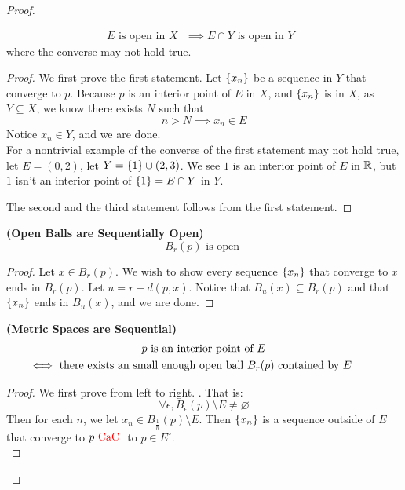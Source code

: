 \documentclass{report}
\begin{document}
\begin{proof}
\begin{theorem}
\begin{gather}
E\text{ is open in $X$ }\implies E\cap Y\text{ is open in $Y$ }
\end{gather}
where the converse may not hold true.
\end{theorem}
\begin{proof}
We first prove the first statement. Let $\{ x_n \}$ be a sequence in $Y$ that converge to $p$. Because  $p$ is an interior point of  $E$ in  $X$, and  $\{ x_n \}$ is in $X$, as  $Y\subseteq X$, we know there exists $N$ such that 
 \begin{equation}
n>N\implies x_n\in E
\end{equation}
Notice $x_n\in Y$, and we are done.\\

For a nontrivial example of the converse of the first statement may not hold true, let $E=(0,2)$, let $Y=\{ 1 \}\cup (2,3)$. We see $1$ is an interior point of  $E$ in  $\mathbb{R}$, but  $1$ isn't an interior point of  $\{ 1 \}=E\cap Y$ in $Y$.

The second and the third statement follows from the first statement. 
\end{proof}
\begin{theorem}
\label{1.3.9}
  \textbf{(Open Balls are Sequentially Open)} 
  \begin{equation}
  B_r(p)\text{ is open }
  \end{equation}
\end{theorem}
\begin{proof}
Let $x\in B_r(p)$. We wish to show every sequence $\{ x_n \}$ that converge to $x$ ends in  $B_r(p)$. Let $u=r-d(p,x)$. Notice that $B_u(x)\subseteq B_r(p)$ and that $\{ x_n \}$ ends in $B_u(x)$, and we are done.
\end{proof}
\begin{theorem}
\label{1.3.10}
\textbf{(Metric Spaces are Sequential)} 
\begin{gather}
\text{ $p$ is an interior point of $E$ }\\
\liff \text{ there exists an small enough open ball $B_r(p)$ contained by $E$}
\end{gather}
\end{theorem}
\begin{proof}
We first prove from left to right. . That is:
\begin{equation}
\forall \epsilon, B_\epsilon (p)\setminus E\neq \varnothing
\end{equation}
Then for each $n$, we let  $x_n\in B_{\frac{1}{n}}(p)\setminus E$. Then $\{ x_n \}$ is a sequence outside of $E$ that converge to  $p\text{ \textcolor{red}{CaC} }$ to $p\in E^\circ $.\\


\end{proof}
\end{proof}
\end{document}
